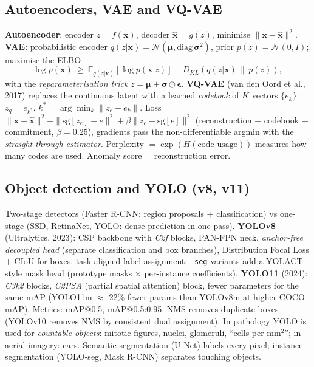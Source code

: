 \subsection{Autoencoders, VAE and VQ-VAE}
\textbf{Autoencoder}: encoder $z=f(\mathbf{x})$, decoder $\hat{\mathbf{x}}=g(z)$, minimise $\|\mathbf{x}-\hat{\mathbf{x}}\|^2$.
\textbf{VAE}: probabilistic encoder $q(z|\mathbf{x})=\mathcal{N}(\bm\mu,\mathrm{diag}\,\bm\sigma^2)$, prior $p(z)=\mathcal{N}(0,I)$;
maximise the ELBO
\[\log p(\mathbf{x})\ \ge\ \mathbb{E}_{q(z|\mathbf{x})}[\log p(\mathbf{x}|z)]-D_{KL}(q(z|\mathbf{x})\,\|\,p(z)),\]
with the \emph{reparameterisation trick} $z=\bm\mu+\bm\sigma\odot\bm\epsilon$. \textbf{VQ-VAE} (van den Oord et al., 2017)
replaces the continuous latent with a learned \emph{codebook} of $K$ vectors $\{e_k\}$: $z_q=e_{k^*}$,
$k^*=\arg\min_k\|z_e-e_k\|$. Loss
$\|\mathbf{x}-\hat{\mathbf{x}}\|^2+\|\mathrm{sg}[z_e]-e\|^2+\beta\|z_e-\mathrm{sg}[e]\|^2$ (reconstruction + codebook +
commitment, $\beta=0.25$), gradients pass the non-differentiable argmin with the \emph{straight-through estimator}.
Perplexity $=\exp(H(\text{code usage}))$ measures how many codes are used. Anomaly score = reconstruction error.

\subsection{Object detection and YOLO (v8, v11)}
Two-stage detectors (Faster R-CNN: region proposals + classification) vs one-stage (SSD, RetinaNet, YOLO: dense
prediction in one pass). \textbf{YOLOv8} (Ultralytics, 2023): CSP backbone with \emph{C2f} blocks, PAN-FPN neck,
\emph{anchor-free decoupled head} (separate classification and box branches), Distribution Focal Loss + CIoU for boxes,
task-aligned label assignment; \texttt{-seg} variants add a YOLACT-style mask head (prototype masks $\times$ per-instance
coefficients). \textbf{YOLO11} (2024): \emph{C3k2} blocks, \emph{C2PSA} (partial spatial attention) block, fewer
parameters for the same mAP (YOLO11m $\approx$ 22\% fewer params than YOLOv8m at higher COCO mAP). Metrics: mAP@0.5,
mAP@0.5:0.95. NMS removes duplicate boxes (YOLOv10 removes NMS by consistent dual assignment). In pathology YOLO is used
for \emph{countable objects}: mitotic figures, nuclei, glomeruli, ``cells per mm$^2$''; in aerial imagery: cars.
Semantic segmentation (U-Net) labels every pixel; instance segmentation (YOLO-seg, Mask R-CNN) separates touching objects.

